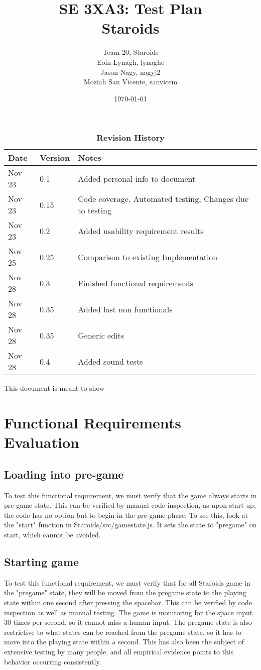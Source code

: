 \documentclass[12pt, titlepage]{article}
\title{SE 3XA3: Test Plan\\Staroids}
\author{Team 20, Staroids
		\\ Eoin Lynagh, lynaghe
		\\ Jason Nagy, nagyj2
		\\ Moziah San Vicente, sanvicem
}
\date{\today}
\begin{document}
\maketitle

\tableofcontents
\listoftables
\listoffigures

\begin{table}[bp]
\caption{\bf Revision History}
\begin{tabularx}{\textwidth}{p{3cm}p{2cm}X}
\toprule {\bf Date} & {\bf Version} & {\bf Notes}\\
\midrule
Nov 23 & 0.1 & Added personal info to document\\
Nov 23 & 0.15 & Code coverage, Automated testing, Changes due to testing\\
Nov 23 & 0.2 & Added usability requirement results\\
Nov 25 & 0.25 & Comparison to existing Implementation\\
Nov 28 & 0.3 & Finished functional requirements\\
Nov 28 & 0.35 & Added last non functionals\\
Nov 28 & 0.35 & Generic edits\\
Nov 28 & 0.4 & Added sound tests\\
\bottomrule
\end{tabularx}
\end{table}

\newpage


This document is meant to show \\

\section{Functional Requirements Evaluation}
\subsection{Loading into pre-game}
To test this functional requirement, we must verify that the game always starts in pre-game state.
This can be verified by manual code inspection, as upon start-up,
the code has no option but to begin in the pre-game phase. To see this,
 look at the "start" function in Staroids/src/gamestate.js.
 It sets the state to "pregame" on start, which cannot be avoided.
\subsection{Starting game}
To test this functional requirement, we must verify that for all Staroids game in the "pregame" state,
they will be moved from the pregame state to the playing state within one second after pressing the spacebar.
This can be verified by code inspection as well as manual testing.
The game is monitoring for the space input 30 times per second, so it cannot miss a human input.
The pregame state is also restrictive to what states can be reached from the pregame state,
so it has to move into the playing state within a second.
This has also been the subject of extensive testing by many people,
and all empirical evidence points to this behavior occurring consistently.
\end{document}
